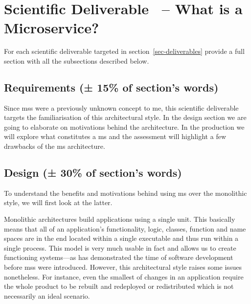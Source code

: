 \section{Scientific Deliverable \thesdel\ -- What is a Microservice?}
{\color{gray}
For each scientific deliverable targeted in section~\ref{sec-deliverables} provide a full section with all the subsections described below.
\label{sec-production}
}

\subsection{Requirements (± 15\% of section's words)}

Since \glspl{ms} were a previously unknown concept to me, this
scientific deliverable targets the familiarisation of this
architectural style. In the design section we are going to elaborate
on motivations behind the architecture.  In the production we will
explore what constitutes a \gls{ms} and the assessment will highlight
a few drawbacks of the \gls{ms} architecture.

\subsection{Design (± 30\% of section's words)}

To understand the benefits and motivations behind using \gls{ms} over
the monolithic style, we will first look at the latter.
\cite{ms-definition}

Monolithic architectures build applications using a single unit. This
basically means that all of an application's functionality, logic,
classes, function and name spaces are in the end located within a
single executable and thus run within a single process. This model is
very much usable in fact and allows us to create functioning
systems---as has demonstrated the time of software development before
\glspl{ms} were introduced. However, this architectural style raises
some issues nonetheless. For instance, even the smallest of changes in
an application require the whole product to be rebuilt and redeployed
or redistributed which is not necessarily an ideal scenario.

